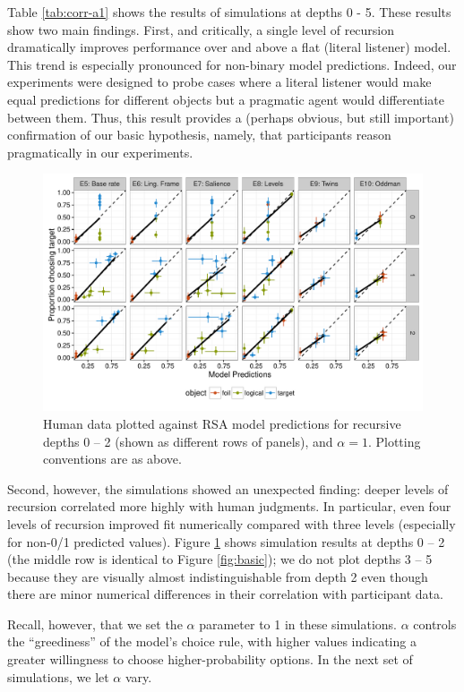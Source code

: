 \documentclass[man,noapacite]{apa2}
\begin{document}
Table \ref{tab:corr-a1} shows the results of simulations at depths 0 - 5. These results show two main findings. First, and critically, a single level of recursion dramatically improves performance over and above a flat (literal listener) model. This trend is especially pronounced for non-binary model predictions. Indeed, our experiments were designed to probe cases where a literal listener would make equal predictions for different objects but a pragmatic agent would differentiate between them. Thus, this result provides a (perhaps obvious, but still important) confirmation of our basic hypothesis, namely, that participants reason pragmatically in our experiments.

\begin{figure}[t]
 \centering
 \includegraphics[width=6in]{../plots/model_depth.pdf}
 \caption{\label{fig:depths} Human data plotted against RSA model predictions for recursive depths 0 -- 2 (shown as different rows of panels), and $\alpha=1$. Plotting conventions are as above.}
\end{figure}

Second, however, the simulations showed an unexpected finding: deeper levels of recursion correlated more highly with human judgments. In particular, even four levels of recursion improved fit numerically compared with three levels (especially for non-0/1 predicted values). Figure \ref{fig:depths} shows simulation results at depths 0 -- 2 (the middle row is identical to Figure \ref{fig:basic}); we do not plot depths 3 -- 5 because they are visually almost indistinguishable from depth 2 even though there are minor numerical differences in their correlation with participant data.

Recall, however, that we set the $\alpha$ parameter to 1 in these simulations. $\alpha$ controls the ``greediness'' of the model's choice rule, with higher values indicating a greater willingness to choose higher-probability options. In the next set of simulations, we let $\alpha$ vary.
\end{document}
